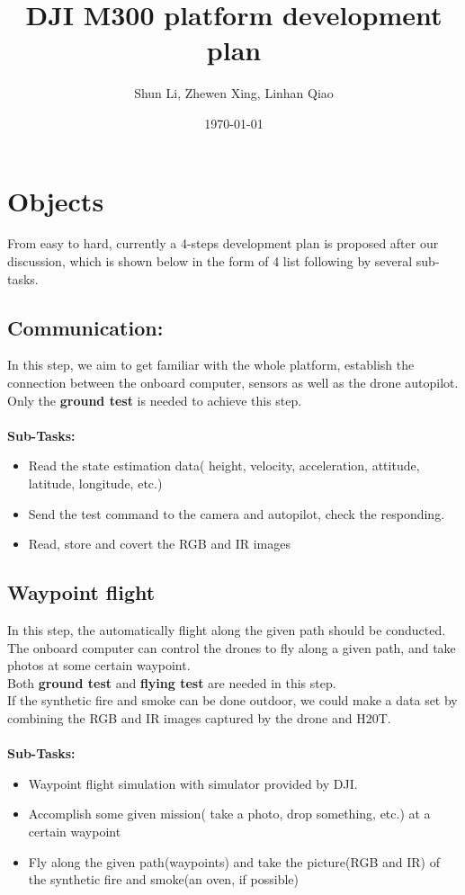 \documentclass{report}
\title{ DJI M300 platform development plan}
\author{Shun Li, Zhewen Xing, Linhan Qiao }
\date{\today}
\begin{document}
\maketitle
\tableofcontents

\chapter{Objects}
From easy to hard, currently a 4-steps development plan is proposed after our
discussion, which is shown below in the form of 4 list following by several
sub-tasks.

\section{Communication:}

In this step, we aim to get familiar with the whole platform, establish
the connection between the onboard computer, sensors as well as the
drone autopilot.
\\
Only the \textbf{ground test} is needed to achieve this step.
\\
\\
\textbf{Sub-Tasks:}

\begin{itemize}
    \item Read the state estimation data( height, velocity, acceleration,
        attitude, latitude, longitude, etc.)
    \item Send the test command to the camera and autopilot, check the
        responding.
    \item Read, store and covert the RGB and IR images 
\end{itemize}


\section{Waypoint flight}

In this step, the automatically flight along the given path should be
conducted. The onboard computer can control the drones to fly along a
given path, and take photos at some certain waypoint.
\\
Both \textbf{ground test} and \textbf{flying test }are needed in this step.
\\
If the synthetic fire and smoke can be done outdoor, we could make a
data set by combining the RGB and IR images captured by the drone and
H20T.
\\
\\
\textbf{Sub-Tasks:}
\begin{itemize}
    \item Waypoint flight simulation with simulator provided by
        DJI.
    \item Accomplish some given mission( take a photo, drop something,
        etc.) at a certain waypoint
    \item Fly along the given path(waypoints) and take the picture(RGB
        and IR) of the synthetic fire and smoke(an oven, if possible) 
\end{itemize}
\end{document}
